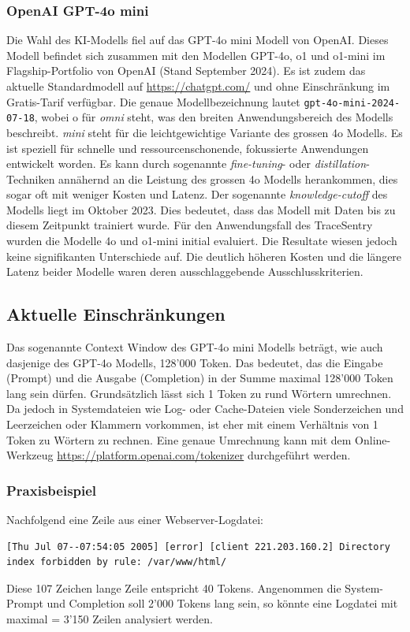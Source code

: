 \documentclass[a4paper,12pt]{report}
\begin{document}
    \subsubsection{OpenAI GPT-4o mini}\label{subsubsec:openai-gpt-4o}
    Die Wahl des KI-Modells fiel auf das GPT-4o mini Modell von OpenAI\@.
    Dieses Modell befindet sich zusammen mit den Modellen GPT-4o, o1 und o1-mini im Flagship-Portfolio von OpenAI (Stand September 2024).
    Es ist zudem das aktuelle Standardmodell auf \url{https://chatgpt.com/} und ohne Einschränkung im Gratis-Tarif verfügbar.
    Die genaue Modellbezeichnung lautet \texttt{gpt-4o-mini-2024-07-18}, wobei o für \textit{omni} steht, was den breiten Anwendungsbereich des Modells beschreibt.
    \textit{mini} steht für die leichtgewichtige Variante des grossen 4o Modells.
    Es ist speziell für schnelle und ressourcenschonende, fokussierte Anwendungen entwickelt worden.
    Es kann durch sogenannte \textit{fine-tuning}- oder \textit{distillation}-Techniken annähernd an die Leistung des grossen 4o Modells herankommen, dies sogar oft mit weniger Kosten und Latenz.
    Der sogenannte \textit{knowledge-cutoff} des Modells liegt im Oktober 2023.
    Dies bedeutet, dass das Modell mit Daten bis zu diesem Zeitpunkt trainiert wurde.
    Für den Anwendungsfall des TraceSentry wurden die Modelle 4o und o1-mini initial evaluiert.
    Die Resultate wiesen jedoch keine signifikanten Unterschiede auf.
    Die deutlich höheren Kosten und die längere Latenz beider Modelle waren deren ausschlaggebende Ausschlusskriterien.

    \subsection{Aktuelle Einschränkungen}\label{subsec:technische-einschrankungen}
    Das sogenannte Context Window des GPT-4o mini Modells beträgt, wie auch dasjenige des GPT-4o Modells, 128'000 Token.
    Das bedeutet, das die Eingabe (Prompt) und die Ausgabe (Completion) in der Summe maximal 128'000 Token lang sein dürfen.
    Grundsätzlich lässt sich 1 Token zu rund  Wörtern umrechnen.
    Da jedoch in Systemdateien wie Log- oder Cache-Dateien viele Sonderzeichen und Leerzeichen oder Klammern vorkommen, ist eher mit einem Verhältnis von 1 Token zu  Wörtern zu rechnen.
    Eine genaue Umrechnung kann mit dem Online-Werkzeug \url{https://platform.openai.com/tokenizer} durchgeführt werden.

    \subsubsection{Praxisbeispiel}\label{subsubsec:praxisbeispiel}
    Nachfolgend eine Zeile aus einer Webserver-Logdatei:
    \begin{verbatim}[Thu Jul 07--07:54:05 2005] [error] [client 221.203.160.2] Directory
index forbidden by rule: /var/www/html/
    \end{verbatim}
    Diese 107 Zeichen lange Zeile entspricht 40 Tokens.
    Angenommen die System-Prompt und Completion soll 2'000 Tokens lang sein, so könnte eine Logdatei mit maximal  = 3'150 Zeilen analysiert werden.
\end{document}
